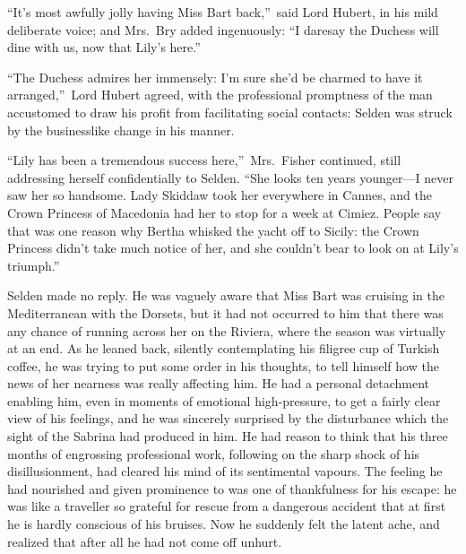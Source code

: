 \documentclass[12pt,a4paper]{book}
\begin{document}
``It's most awfully jolly having Miss Bart back,''\ said Lord
Hubert, in his mild deliberate voice; and Mrs.\ Bry added
ingenuously: ``I daresay the Duchess will dine with us, now that
Lily's here.''





``The Duchess admires her immensely: I'm sure she'd be charmed to
have it arranged,''\ Lord Hubert agreed, with the professional
promptness of the man accustomed to draw his profit from
facilitating social contacts: Selden was struck by the
businesslike change in his manner.





``Lily has been a tremendous success here,''\ Mrs.\ Fisher continued,
still addressing herself confidentially to Selden. ``She looks ten
years younger---I never saw her so handsome. Lady Skiddaw took her
everywhere in Cannes, and the Crown Princess of Macedonia
had her to stop for a week at Cimiez. People say that was one
reason why Bertha whisked the yacht off to Sicily: the Crown
Princess didn't take much notice of her, and she couldn't bear to
look on at Lily's triumph.''





Selden made no reply. He was vaguely aware that Miss Bart was
cruising in the Mediterranean with the Dorsets, but it had not
occurred to him that there was any chance of running across her
on the Riviera, where the season was virtually at an end. As he
leaned back, silently contemplating his filigree cup of Turkish
coffee, he was trying to put some order in his thoughts, to tell
himself how the news of her nearness was really affecting him. He
had a personal detachment enabling him, even in moments of
emotional high-pressure, to get a fairly clear view of his
feelings, and he was sincerely surprised by the disturbance which
the sight of the Sabrina had produced in him. He had reason to
think that his three months of engrossing professional work,
following on the sharp shock of his disillusionment, had cleared
his mind of its sentimental vapours. The feeling he had nourished
and given prominence to was one of thankfulness for his escape: 
he was like a traveller so grateful for rescue from a dangerous
accident that at first he is hardly conscious of his bruises. Now
he suddenly felt the latent ache, and realized that after all he
had not come off unhurt.
\end{document}
